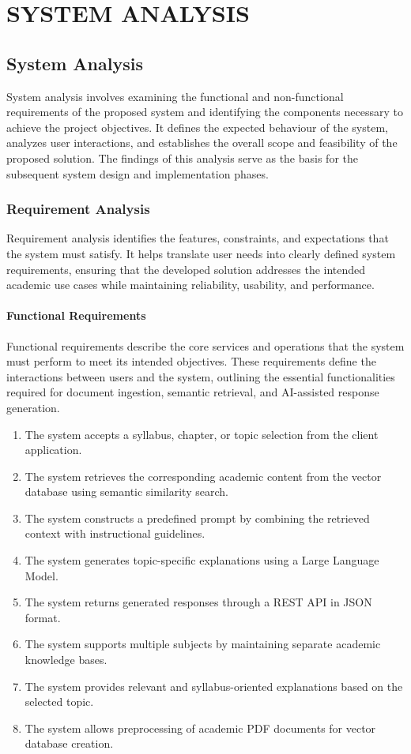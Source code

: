 \chapter{SYSTEM ANALYSIS}

\section{System Analysis}

System analysis involves examining the functional and non-functional requirements of the proposed system and identifying the components necessary to achieve the project objectives. It defines the expected behaviour of the system, analyzes user interactions, and establishes the overall scope and feasibility of the proposed solution. The findings of this analysis serve as the basis for the subsequent system design and implementation phases.


\subsection{Requirement Analysis}
Requirement analysis identifies the features, constraints, and expectations that the system must satisfy. It helps translate user needs into clearly defined system requirements, ensuring that the developed solution addresses the intended academic use cases while maintaining reliability, usability, and performance.

\subsubsection{Functional Requirements}
Functional requirements describe the core services and operations that the system must perform to meet its intended objectives. These requirements define the interactions between users and the system, outlining the essential functionalities required for document ingestion, semantic retrieval, and AI-assisted response generation.
\begin{enumerate}
    \item The system accepts a syllabus, chapter, or topic selection from the client application.
    \item The system retrieves the corresponding academic content from the vector database using semantic similarity search.
    \item The system constructs a predefined prompt by combining the retrieved context with instructional guidelines.
    \item The system generates topic-specific explanations using a Large Language Model.
    \item The system returns generated responses through a REST API in JSON format.
    \item The system supports multiple subjects by maintaining separate academic knowledge bases.
    \item The system provides relevant and syllabus-oriented explanations based on the selected topic.
    \item The system allows preprocessing of academic PDF documents for vector database creation.
\end{enumerate}

